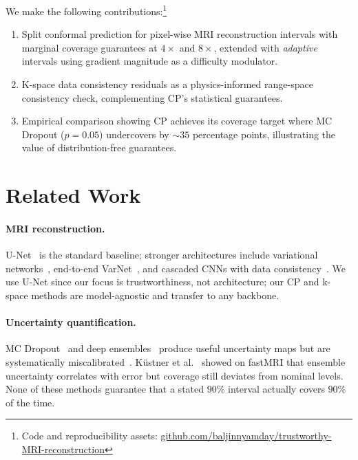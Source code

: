 \documentclass[runningheads]{llncs}
\begin{document}
We make the following contributions:\footnote{Code and reproducibility assets: \href{https://github.com/baljinnyamday/trustworthy-MRI-reconstruction}{github.com/baljinnyamday/trustworthy-MRI-reconstruction}}
\begin{enumerate}
    \item Split conformal prediction for pixel-wise MRI reconstruction intervals with marginal coverage guarantees at $4{\times}$ and $8{\times}$, extended with \emph{adaptive} intervals using gradient magnitude as a difficulty modulator.
    \item K-space data consistency residuals as a physics-informed range-space consistency check, complementing CP's statistical guarantees.
    \item Empirical comparison showing CP achieves its coverage target where MC Dropout ($p{=}0.05$) undercovers by ${\sim}35$ percentage points, illustrating the value of distribution-free guarantees.
\end{enumerate}

\section{Related Work}

\paragraph{MRI reconstruction.} U-Net~\cite{ronneberger2015unet} is the standard baseline; stronger architectures include variational networks~\cite{hammernik2018varnet}, end-to-end VarNet~\cite{sriram2020e2evarnet}, and cascaded CNNs with data consistency~\cite{schlemper2018cascade}. We use U-Net since our focus is trustworthiness, not architecture; our CP and k-space methods are model-agnostic and transfer to any backbone.

\paragraph{Uncertainty quantification.} MC Dropout~\cite{gal2016dropout} and deep ensembles~\cite{lakshminarayanan2017ensembles} produce useful uncertainty maps but are systematically miscalibrated~\cite{kuleshov2018calibration}. K\"ustner et al.~\cite{kustner2024ensembles} showed on fastMRI that ensemble uncertainty correlates with error but coverage still deviates from nominal levels. None of these methods guarantee that a stated $90\%$ interval actually covers $90\%$ of the time.
\end{document}
